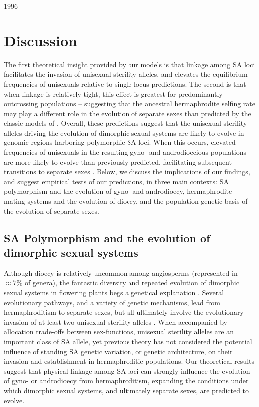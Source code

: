 1996\documentclass[9pt,twocolumn,twoside,lineno]{gsajnl}
\begin{document}
\section{Discussion}

The first theoretical insight provided by our models is that linkage among SA loci facilitates the invasion of unisexual sterility alleles, and elevates the equilibrium frequencies of unisexuals relative to single-locus predictions. The second is that when linkage is relatively tight, this effect is greatest for predominantly outcrossing populations -- suggesting that the ancestral hermaphrodite selfing rate may play a different role in the evolution of separate sexes than predicted by the classic models of \citep{Charlesworth1978a}. Overall, these predictions suggest that the unisexual sterility alleles driving the evolution of dimorphic sexual systems are likely to evolve in genomic regions harboring polymorphic SA loci. When this occurs, elevated frequencies of unisexuals in the resulting gyno- and androdioecious populations are more likely to evolve than previously predicted, facilitating subsequent transitions to separate sexes \citep{Charlesworth1978a}. Below, we discuss the implications of our findings, and suggest empirical tests of our predictions, in three main contexts: SA polymorphism and the evolution of gyno- and androdioecy, hermaphrodite mating systems and the evolution of dioecy, and the population genetic basis of the evolution of separate sexes.

\subsection{SA Polymorphism and the evolution of dimorphic sexual systems}

Although dioecy is relatively uncommon among angiosperms (represented in $\approx 7\%$ of genera), the fantastic diversity and repeated evolution of dimorphic sexual systems in flowering plants begs a genetical explanation \citep{Renner2014,KaferPannell2017}. Several evolutionary pathways, and a variety of genetic mechanisms, lead from hermaphroditism to separate sexes, but all ultimately involve the evolutionary invasion of at least two unisexual sterility alleles \citep{Charlesworth1978a,Charlesworth1978b,Renner2014,Ashman2015}. When accompanied by allocation trade-offs between sex-functions, unisexual sterility alleles are an important class of SA allele, yet previous theory has not considered the potential influence of standing SA genetic variation, or genetic architecture, on their invasion and establishment in hermaphroditic populations. Our theoretical results suggest that physical linkage among SA loci can strongly influence the evolution of gyno- or androdioecy from hermaphroditism, expanding the conditions under which dimorphic sexual systems, and ultimately separate sexes, are predicted to evolve. 
\end{document}
